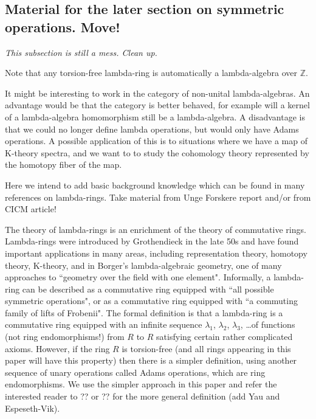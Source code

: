\documentclass[a4paper]{article}
\begin{document}
\subsection*{Material for the later section on symmetric operations. Move!}

\emph{This subsection is still a mess. Clean up.}

\begin{remark}
Note that any torsion-free lambda-ring is automatically a lambda-algebra over $\mathbb{Z}$.
\end{remark}

\begin{remark}
It might be interesting to work in the category of non-unital lambda-algebras. An advantage would be that the category is better behaved, for example will a kernel of a lambda-algebra homomorphism still be a lambda-algebra. A disadvantage is that we could no longer define lambda operations, but would only have Adams operations. A possible application of this is to situations where we have a map of K-theory spectra, and we want to to study the cohomology theory represented by the homotopy fiber of the map.
\end{remark}

Here we intend to add basic background knowledge which can be found in many references on lambda-rings. Take material from Unge Forskere report and/or from CICM article!

The theory of lambda-rings is an enrichment of the theory of commutative rings. Lambda-rings were introduced by Grothendieck in the late 50s and have found important applications in many areas, including representation theory, homotopy theory, K-theory, and in Borger's lambda-algebraic geometry, one of many approaches to ``geometry over the field with one element". Informally, a lambda-ring can be described as a commutative ring equipped with ``all possible symmetric operations", or as a commutative ring equipped with ``a commuting family of lifts of Frobenii". The formal definition is that a lambda-ring is a commutative ring equipped with an infinite sequence $\lambda_1$, $\lambda_2$, $\lambda_3$, \ldots of functions (not ring endomorphisms!) from $R$ to $R$ satisfying certain rather complicated axioms. However, if the ring $R$ is torsion-free (and all rings appearing in this paper will have this property) then there is a simpler definition, using another sequence of unary operations called Adams operations, which are ring endomorphisms. We use the simpler approach in this paper and refer the interested reader to ?? or ?? for the more general definition (add Yau and Espeseth-Vik). 
\end{document}
